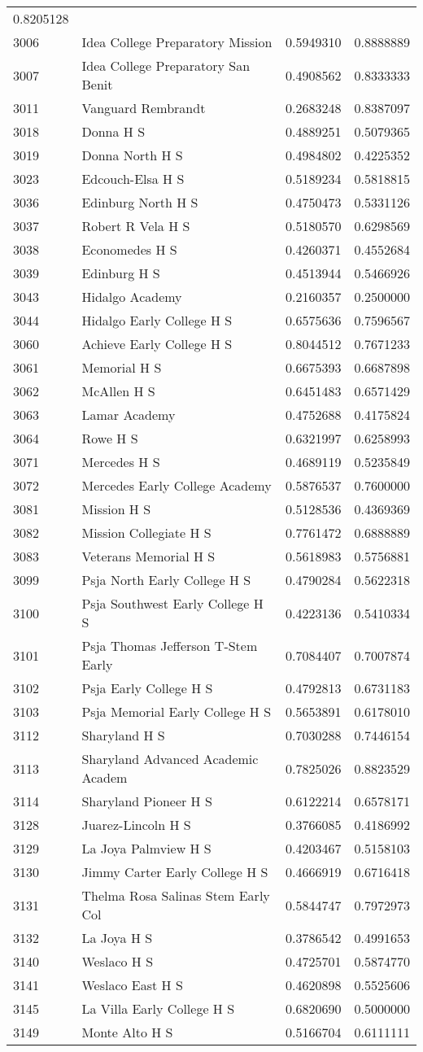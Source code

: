 \documentclass[
]{article}
\begin{document}
\begin{longtable}[]{@{}llrr@{}}
0.8205128\tabularnewline
3006 & Idea College Preparatory Mission & 0.5949310 &
0.8888889\tabularnewline
3007 & Idea College Preparatory San Benit & 0.4908562 &
0.8333333\tabularnewline
3011 & Vanguard Rembrandt & 0.2683248 & 0.8387097\tabularnewline
3018 & Donna H S & 0.4889251 & 0.5079365\tabularnewline
3019 & Donna North H S & 0.4984802 & 0.4225352\tabularnewline
3023 & Edcouch-Elsa H S & 0.5189234 & 0.5818815\tabularnewline
3036 & Edinburg North H S & 0.4750473 & 0.5331126\tabularnewline
3037 & Robert R Vela H S & 0.5180570 & 0.6298569\tabularnewline
3038 & Economedes H S & 0.4260371 & 0.4552684\tabularnewline
3039 & Edinburg H S & 0.4513944 & 0.5466926\tabularnewline
3043 & Hidalgo Academy & 0.2160357 & 0.2500000\tabularnewline
3044 & Hidalgo Early College H S & 0.6575636 & 0.7596567\tabularnewline
3060 & Achieve Early College H S & 0.8044512 & 0.7671233\tabularnewline
3061 & Memorial H S & 0.6675393 & 0.6687898\tabularnewline
3062 & McAllen H S & 0.6451483 & 0.6571429\tabularnewline
3063 & Lamar Academy & 0.4752688 & 0.4175824\tabularnewline
3064 & Rowe H S & 0.6321997 & 0.6258993\tabularnewline
3071 & Mercedes H S & 0.4689119 & 0.5235849\tabularnewline
3072 & Mercedes Early College Academy & 0.5876537 &
0.7600000\tabularnewline
3081 & Mission H S & 0.5128536 & 0.4369369\tabularnewline
3082 & Mission Collegiate H S & 0.7761472 & 0.6888889\tabularnewline
3083 & Veterans Memorial H S & 0.5618983 & 0.5756881\tabularnewline
3099 & Psja North Early College H S & 0.4790284 &
0.5622318\tabularnewline
3100 & Psja Southwest Early College H S & 0.4223136 &
0.5410334\tabularnewline
3101 & Psja Thomas Jefferson T-Stem Early & 0.7084407 &
0.7007874\tabularnewline
3102 & Psja Early College H S & 0.4792813 & 0.6731183\tabularnewline
3103 & Psja Memorial Early College H S & 0.5653891 &
0.6178010\tabularnewline
3112 & Sharyland H S & 0.7030288 & 0.7446154\tabularnewline
3113 & Sharyland Advanced Academic Academ & 0.7825026 &
0.8823529\tabularnewline
3114 & Sharyland Pioneer H S & 0.6122214 & 0.6578171\tabularnewline
3128 & Juarez-Lincoln H S & 0.3766085 & 0.4186992\tabularnewline
3129 & La Joya Palmview H S & 0.4203467 & 0.5158103\tabularnewline
3130 & Jimmy Carter Early College H S & 0.4666919 &
0.6716418\tabularnewline
3131 & Thelma Rosa Salinas Stem Early Col & 0.5844747 &
0.7972973\tabularnewline
3132 & La Joya H S & 0.3786542 & 0.4991653\tabularnewline
3140 & Weslaco H S & 0.4725701 & 0.5874770\tabularnewline
3141 & Weslaco East H S & 0.4620898 & 0.5525606\tabularnewline
3145 & La Villa Early College H S & 0.6820690 & 0.5000000\tabularnewline
3149 & Monte Alto H S & 0.5166704 & 0.6111111\tabularnewline

\end{longtable}
\end{document}
